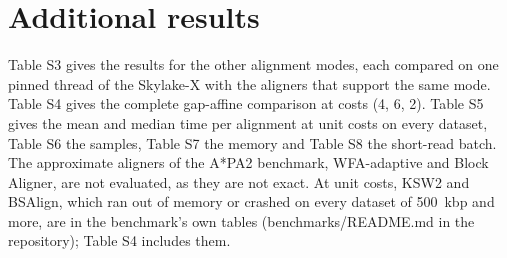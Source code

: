 \documentclass[10pt]{article}
\begin{document}
\begin{table}[t]
\caption{Effect of each technique: median time with all techniques on (ms per alignment; per batch of 500{,}000 pairs for the short reads), and the change when one technique is switched off, over three alternating rounds on the Skylake-X at commit \texttt{dc980d7}, with branches kept clear of 32-byte boundaries. Every configuration returned the same costs.}\label{tab:ablation}
\centering\footnotesize
\setlength{\tabcolsep}{4pt}
\end{table}

\section{Additional results}

Table S3 gives the results for the other alignment modes, each compared on one pinned thread of the Skylake-X with the aligners that support the same mode. Table S4 gives the complete gap-affine comparison at costs (4, 6, 2). Table S5 gives the mean and median time per alignment at unit costs on every dataset, Table S6 the samples, Table S7 the memory and Table S8 the short-read batch. The approximate aligners of the A*PA2 benchmark, WFA-adaptive and Block Aligner, are not evaluated, as they are not exact. At unit costs, KSW2 and BSAlign, which ran out of memory or crashed on every dataset of 500~kbp and more, are in the benchmark's own tables (benchmarks/README.md in the repository); Table S4 includes them.
\end{document}
